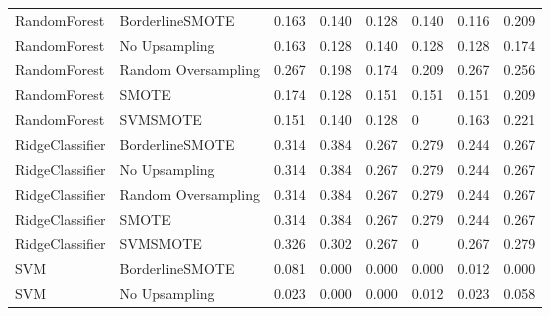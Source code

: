 \begin{tabular}{llllllll}
                RandomForest &     BorderlineSMOTE & 0.163 &                     0.140 &                 0.128 &                  0.140 &                                   0.116 &     0.209 \\
                RandomForest &       No Upsampling & 0.163 &                     0.128 &                 0.140 &                  0.128 &                                   0.128 &     0.174 \\
                RandomForest & Random Oversampling & 0.267 &                     0.198 &                 0.174 &                  0.209 &                                   0.267 &     0.256 \\
                RandomForest &               SMOTE & 0.174 &                     0.128 &                 0.151 &                  0.151 &                                   0.151 &     0.209 \\
                RandomForest &            SVMSMOTE & 0.151 &                     0.140 &                 0.128 &                      0 &                                   0.163 &     0.221 \\
             RidgeClassifier &     BorderlineSMOTE & 0.314 &                     0.384 &                 0.267 &                  0.279 &                                   0.244 &     0.267 \\
             RidgeClassifier &       No Upsampling & 0.314 &                     0.384 &                 0.267 &                  0.279 &                                   0.244 &     0.267 \\
             RidgeClassifier & Random Oversampling & 0.314 &                     0.384 &                 0.267 &                  0.279 &                                   0.244 &     0.267 \\
             RidgeClassifier &               SMOTE & 0.314 &                     0.384 &                 0.267 &                  0.279 &                                   0.244 &     0.267 \\
             RidgeClassifier &            SVMSMOTE & 0.326 &                     0.302 &                 0.267 &                      0 &                                   0.267 &     0.279 \\
                         SVM &     BorderlineSMOTE & 0.081 &                     0.000 &                 0.000 &                  0.000 &                                   0.012 &     0.000 \\
                         SVM &       No Upsampling & 0.023 &                     0.000 &                 0.000 &                  0.012 &                                   0.023 &     0.058 \\

\end{tabular}

